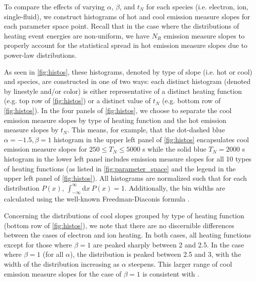 \documentclass[apj]{emulateapj}
\begin{document}
	\par To compare the effects of varying $\alpha$, $\beta$, and $t_N$ for each species (i.e. electron, ion, single-fluid), we construct histograms of hot and cool emission measure slopes for each parameter space point. Recall that in the case where the distributions of heating event energies are non-uniform, we have $N_{R}$ emission measure slopes to properly account for the statistical spread in hot emission measure slopes due to power-law distributions.
	\par As seen in \autoref{fig:histos}, these histograms, denoted by type of slope (i.e. hot or cool) and species, are constructed in one of two ways: each distinct histogram (denoted by linestyle and/or color) is either representative of a distinct heating function (e.g. top row of \autoref{fig:histos}) or a distinct value of $t_N$ (e.g. bottom row of \autoref{fig:histos}). In the four panels of \autoref{fig:histos}, we choose to separate the cool emission measure slopes by type of heating function and the hot emission measure slopes by $t_N$. This means, for example, that the dot-dashed blue $\alpha=-1.5,\beta=1$ histogram in the upper left panel of \autoref{fig:histos} encapsulates cool emission measure slopes for $250\le T_N\le5000$ s while the solid blue $T_N=2000$ s histogram in the lower left panel includes emission measure slopes for all 10 types of heating functions (as listed in \autoref{fig:parameter_space} and the legend in the upper left panel of \autoref{fig:histos}). All histograms are normalized such that for each distribution $P(x)$, $\int_{-\infty}^{\infty}\mathrm{d}x~P(x)=1$. Additionally, the bin widths are calculated using the well-known Freedman-Diaconis formula \citep{freedman_histogram_1981}.
	\par Concerning the distributions of cool slopes grouped by type of heating function (bottom row of \autoref{fig:histos}), we note that there are no discernible differences between the cases of electron and ion heating. In both cases, all heating functions except for those where $\beta=1$ are peaked sharply between 2 and 2.5. In the case where $\beta=1$ (for all $\alpha$), the distribution is peaked between 2.5 and 3, with the width of the distribution increasing as $\alpha$ steepens. This larger range of cool emission measure slopes for the case of $\beta=1$ is consistent with \citet{cargill_active_2014}.
\end{document}
